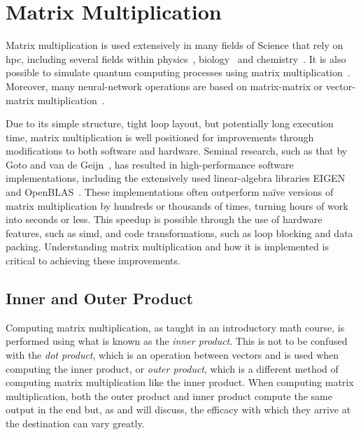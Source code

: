 \documentclass[\main/thesis.tex]{subfiles}
\begin{document}
\chapter{Matrix Multiplication}
\label{cha:matmul}
Matrix multiplication is used extensively in many fields of Science that rely on \gls{hpc}, including
several fields within physics~\autocite{krol2014matrix}, biology~\autocite{akutsu2000algorithms} and chemistry~\autocite{weber2015semiempirical}.
It is also possible to simulate quantum computing processes using matrix multiplication~\autocite{zulehner2019matrix}.
Moreover, many neural-network operations are based on matrix-matrix or vector-matrix multiplication~\autocite{rojas1996neural,blue1992training}.

Due to its simple structure, tight loop layout, but potentially long execution time, matrix multiplication is well positioned for improvements through modifications to both software and hardware.
Seminal research, such as that by Goto and van de Geijn~\autocite{goto2008anatomy}, has resulted in high-performance software implementations, including the extensively used linear-algebra libraries EIGEN~\autocite{guennebaud2021eigen} and OpenBLAS~\autocite{xianyi2012model}.
These implementations often outperform na\"ive versions of matrix multiplication by hundreds or thousands of times, turning hours of work into seconds or less.
This speedup is possible through the use of hardware features, such as \gls{simd}, and code transformations, such as loop blocking and data packing.
Understanding matrix multiplication and how it is implemented is critical to achieving these improvements.

\section{Inner and Outer Product}
\label{sec:products}
Computing matrix multiplication, as taught in an introductory math course, is performed using what is known as the \emph{inner product}.
This is not to be confused with the \emph{dot product}, which is an operation between vectors and is used when computing the inner product, or \emph{outer product}, which is a different method of computing matrix multiplication like the inner product.
When computing matrix multiplication, both the outer product and inner product compute the same output in the end but, as  and  will discuss, the efficacy with which they arrive at the destination can vary greatly.
\end{document}
